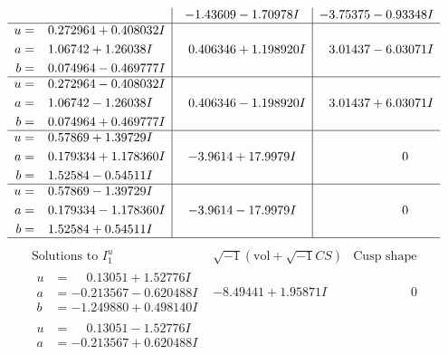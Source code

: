 \documentclass[1p]{elsarticle_modified}
\theoremstyle{definition}
\newcommand{\I}{\sqrt{-1}}
\begin{document}
$$\begin{array}{c|c|c}
 & -1.43609 - 1.70978 I & -3.75375 - 0.93348 I \\ \hline\begin{aligned}
u &= \phantom{-}0.272964 + 0.408032 I \\
a &= \phantom{-}1.06742 + 1.26038 I \\
b &= \phantom{-}0.074964 - 0.469777 I\end{aligned}
 & \phantom{-}0.406346 + 1.198920 I & \phantom{-}3.01437 - 6.03071 I \\ \hline\begin{aligned}
u &= \phantom{-}0.272964 - 0.408032 I \\
a &= \phantom{-}1.06742 - 1.26038 I \\
b &= \phantom{-}0.074964 + 0.469777 I\end{aligned}
 & \phantom{-}0.406346 - 1.198920 I & \phantom{-}3.01437 + 6.03071 I \\ \hline\begin{aligned}
u &= \phantom{-}0.57869 + 1.39729 I \\
a &= \phantom{-}0.179334 + 1.178360 I \\
b &= \phantom{-}1.52584 - 0.54511 I\end{aligned}
 & -3.9614 + 17.9979 I & \phantom{-0.000000 } 0 \\ \hline\begin{aligned}
u &= \phantom{-}0.57869 - 1.39729 I \\
a &= \phantom{-}0.179334 - 1.178360 I \\
b &= \phantom{-}1.52584 + 0.54511 I\end{aligned}
 & -3.9614 - 17.9979 I & \phantom{-0.000000 } 0\\
 \hline 
 \end{array}$$\newpage$$\begin{array}{c|c|c}  
\text{Solutions to }I^u_{1}& \I (\text{vol} + \sqrt{-1}CS) & \text{Cusp shape}\\
 \hline 
\begin{aligned}
u &= \phantom{-}0.13051 + 1.52776 I \\
a &= -0.213567 - 0.620488 I \\
b &= -1.249880 + 0.498140 I\end{aligned}
 & -8.49441 + 1.95871 I & \phantom{-0.000000 } 0 \\ \hline\begin{aligned}
u &= \phantom{-}0.13051 - 1.52776 I \\
a &= -0.213567 + 0.620488 I \\

\end{aligned}
\end{array}$$
\end{document}
